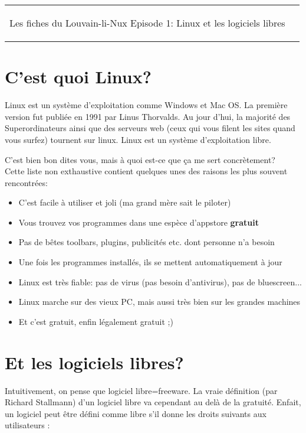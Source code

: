 



\begin{tabular}{p{13cm}r}
	\begin{center}{\Large Les fiches du Louvain-li-Nux\linebreak \linebreak
	\LARGE Episode 1: Linux et les logiciels libres}\end{center}
		&
	\usebox{\logollnux}
\end{tabular}


\section*{C'est quoi Linux?}

Linux est un système d'exploitation comme Windows et Mac OS. La première version fut publiée en 1991 par Linus Thorvalds.
Au jour d'hui, la majorité des Superordinateurs ainsi que des serveurs web (ceux qui vous filent les sites quand vous surfez)
tournent sur linux. Linux est un système d'exploitation libre.
\vspace{0.5cm}

C'est bien bon dites vous, mais à quoi est-ce que ça me sert concrètement?\\
Cette liste non exthaustive contient quelques unes des raisons les plus souvent rencontrées:
\begin{itemize}
\item C'est facile à utiliser et joli (ma grand mère sait le piloter)
\item Vous trouvez vos programmes dans une espèce d'appstore \textbf{gratuit}
\item Pas de bêtes toolbars, plugins, publicités etc. dont personne n'a besoin
\item Une fois les programmes installés, ils se mettent automatiquement à jour
\item Linux est très fiable: pas de virus (pas besoin d'antivirus), pas de bluescreen...
\item Linux marche sur des vieux PC, mais aussi très bien sur les grandes machines
\item Et c'est gratuit, enfin légalement gratuit ;)
\end{itemize}

\section*{Et les logiciels libres?}
Intuitivement, on pense que logiciel libre=freeware.
La vraie définition (par Richard Stallmann) d'un logiciel libre va cependant au delà de la gratuité.
Enfait, un logiciel peut être défini comme libre s'il donne les droits suivants aux utilisateurs :

